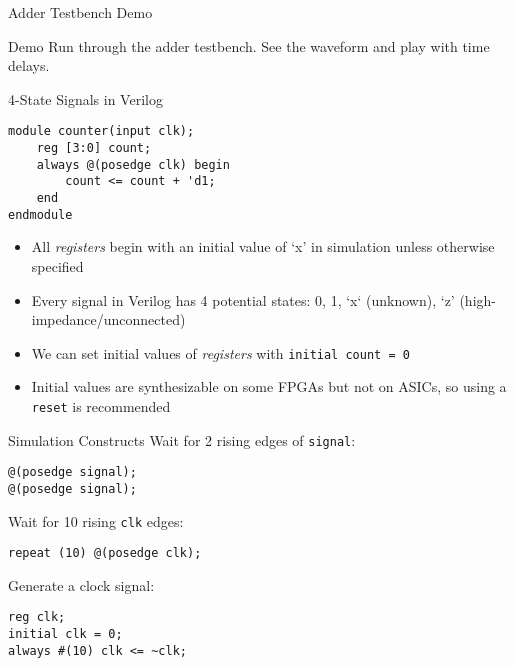 \documentclass[12pt,aspectratio=169]{beamer}
\begin{document}
\begin{frame}[fragile]{Adder Testbench Demo}
  \begin{block}{Demo}
    Run through the adder testbench. See the waveform and play with time delays.
  \end{block}
\end{frame}

\begin{frame}[fragile]{4-State Signals in Verilog}
    \begin{verbatim}
module counter(input clk);
    reg [3:0] count;
    always @(posedge clk) begin
        count <= count + 'd1;
    end
endmodule
    \end{verbatim}
  \begin{itemize}
    \item All \textit{registers} begin with an initial value of `x' in simulation unless otherwise specified
    \item Every signal in Verilog has 4 potential states: 0, 1, `x` (unknown), `z' (high-impedance/unconnected)
    \item We can set initial values of \textit{registers} with \verb|initial count = 0|
    \item Initial values are synthesizable on some FPGAs but not on ASICs, so using a \verb|reset| is recommended
  \end{itemize}
\end{frame}

\begin{frame}[fragile]{Simulation Constructs}
  Wait for 2 rising edges of \verb|signal|:
  \begin{center}
    \begin{verbatim}
@(posedge signal);
@(posedge signal);
    \end{verbatim}
  \end{center}

  Wait for 10 rising \verb|clk| edges:
  \begin{center}
    \begin{verbatim}
repeat (10) @(posedge clk);
    \end{verbatim}
  \end{center}

  Generate a clock signal:
  \begin{verbatim}
reg clk;
initial clk = 0;
always #(10) clk <= ~clk;
  \end{verbatim}
\end{frame}
\end{document}
